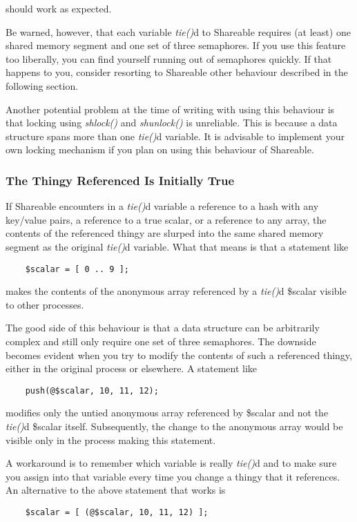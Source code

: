 should work as expected.

Be warned, however, that each variable {\em tie()\/}d to Shareable requires (at
least) one shared memory segment and one set of three semaphores.  If
you use this feature too liberally, you can find yourself running out
of semaphores quickly.  If that happens to you, consider resorting to
Shareable other behaviour described in the following section.

Another potential problem at the time of writing with using this
behaviour is that locking using {\em shlock()\/} and {\em shunlock()\/} is unreliable.
This is because a data structure spans more than one {\em tie()\/}d variable.  It
is advisable to implement your own locking mechanism if you plan on using
this behaviour of Shareable.

\subsubsection*{The Thingy Referenced Is Initially True}%

If Shareable encounters in a {\em tie()\/}d variable a reference to a hash with
any key/value pairs, a reference to a true scalar, or a reference to
any array, the contents of the referenced thingy are slurped into the
same shared memory segment as the original {\em tie()\/}d variable.  What that
means is that a statement like
\begin{verbatim}
    $scalar = [ 0 .. 9 ];
\end{verbatim}

makes the contents of the anonymous array referenced by a {\em tie()\/}d \$scalar
visible to other processes.

The good side of this behaviour is that a data structure can be
arbitrarily complex and still only require one set of three
semaphores.  The downside becomes evident when you try to modify the
contents of such a referenced thingy, either in the original process
or elsewhere.  A statement like
\begin{verbatim}
    push(@$scalar, 10, 11, 12);
\end{verbatim}

modifies only the untied anonymous array referenced by \$scalar and not
the {\em tie()\/}d \$scalar itself.  Subsequently, the change to the anonymous
array would be visible only in the process making this statement.

A workaround is to remember which variable is really {\em tie()\/}d and to make
sure you assign into that variable every time you change a thingy that
it references.  An alternative to the above statement that works is
\begin{verbatim}
    $scalar = [ (@$scalar, 10, 11, 12) ];
\end{verbatim}

